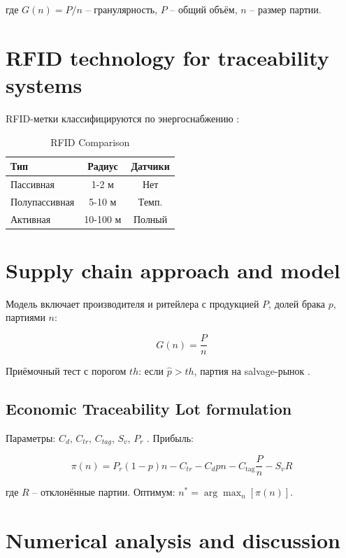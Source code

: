 \documentclass[fleqn,10pt,russian]{olplainarticle-class}
\begin{document}
где $G(n)=P/n$ -- гранулярность, $P$ -- общий объём, $n$ -- размер партии.

\section*{RFID technology for traceability systems}

RFID-метки классифицируются по энергоснабжению \cite{BartkovaJouvet1999}:

\begin{table}[h]
\centering
\caption{RFID Comparison}
\begin{tabular}{|l|c|c|}
\hline
Тип & Радиус & Датчики \\
\hline
Пассивная & 1-2 м & Нет \\
Полупассивная & 5-10 м & Темп. \\
Активная & 10-100 м & Полный \\
\hline
\end{tabular}
\label{tab:rfid}
\end{table}

\section*{Supply chain approach and model}

Модель включает производителя и ритейлера с продукцией $P$, долей брака $p$, партиями $n$:

\begin{equation}
G(n)=\frac{P}{n}
\label{eq:granularity}
\end{equation}

Приёмочный тест с порогом $th$: если $\hat{p}>th$, партия на salvage-рынок \cite{Indura2010}.

\subsection*{Economic Traceability Lot formulation}

Параметры: $C_d$, $C_{tr}$, $C_{tag}$, $S_v$, $P_r$ \cite{NACA460}. Прибыль:

\begin{equation}
\pi(n)=P_r(1-p)n-C_{tr}-C_d pn-C_{\text{tag}}\frac{P}{n}-S_v R
\label{eq:profit}
\end{equation}

где $R$ -- отклонённые партии. Оптимум: $n^*=\arg\max_n[\pi(n)]$.

\section*{Numerical analysis and discussion}
\end{document}
